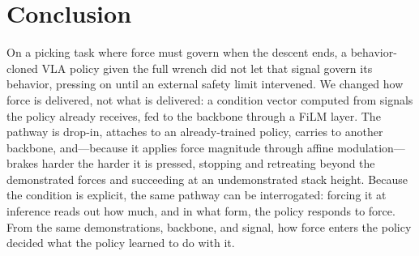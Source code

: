 \section{Conclusion}
\label{sec:conclusion}

On a picking task where force must govern when the descent ends, a behavior-cloned VLA policy
given the full wrench did not let that signal govern its behavior, pressing on until an
external safety limit intervened. We changed how force is delivered, not what is delivered: a
condition vector computed from signals the policy already receives, fed to the backbone
through a FiLM layer. The pathway is drop-in, attaches to an already-trained policy, carries to
another backbone, and---because it applies force magnitude through affine modulation---brakes
harder the harder it is pressed, stopping and retreating beyond the demonstrated forces and
succeeding at an undemonstrated stack height. Because the condition is explicit, the same
pathway can be interrogated: forcing it at inference reads out how much, and in what form, the
policy responds to force. From the same demonstrations, backbone, and signal, how force enters
the policy decided what the policy learned to do with it.
